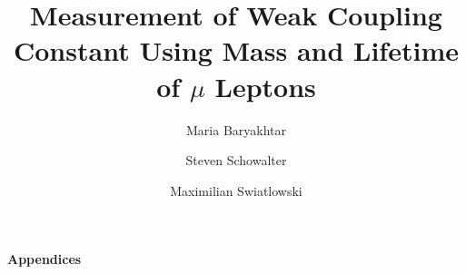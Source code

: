 \documentclass[psfig,12pt,notitlepage]{article}
\begin{document}
\title{Measurement of Weak Coupling Constant Using Mass and Lifetime of $\mu$ Leptons}
\author{Maria Baryakhtar \and Steven Schowalter \and Maximilian Swiatlowski}

\maketitle



\tableofcontents
\setcounter{tocdepth}{2}
\listoffigures

\clearpage











\newpage

\appendix

\begin{center}
\begin{Large}
\bfseries{Appendices}
\end{Large}
\end{center}





\end{document}
